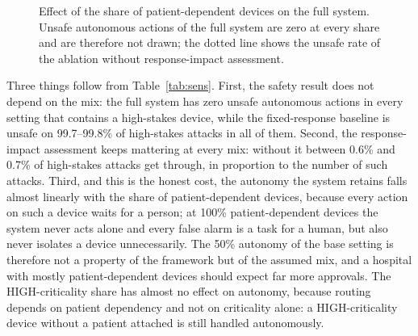 \documentclass[preprint,12pt]{elsarticle}
\begin{document}
\begin{figure}[htbp]
\centering
{}
\caption{Effect of the share of patient-dependent devices on the full system. Unsafe autonomous actions of the full system are zero at every share and are therefore not drawn; the dotted line shows the unsafe rate of the ablation without response-impact assessment.}
\label{fig:sens}
\end{figure}

Three things follow from Table~\ref{tab:sens}. First, the safety result does not depend on the mix: the full system has zero unsafe autonomous actions in every setting that contains a high-stakes device, while the fixed-response baseline is unsafe on 99.7--99.8\% of high-stakes attacks in all of them. Second, the response-impact assessment keeps mattering at every mix: without it between 0.6\% and 0.7\% of high-stakes attacks get through, in proportion to the number of such attacks. Third, and this is the honest cost, the autonomy the system retains falls almost linearly with the share of patient-dependent devices, because every action on such a device waits for a person; at 100\% patient-dependent devices the system never acts alone and every false alarm is a task for a human, but also never isolates a device unnecessarily. The 50\% autonomy of the base setting is therefore not a property of the framework but of the assumed mix, and a hospital with mostly patient-dependent devices should expect far more approvals. The HIGH-criticality share has almost no effect on autonomy, because routing depends on patient dependency and not on criticality alone: a HIGH-criticality device without a patient attached is still handled autonomously.
\end{document}
